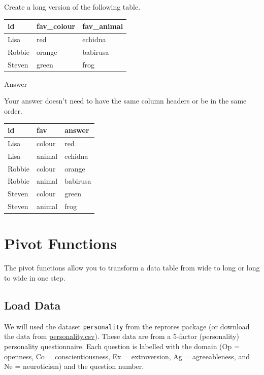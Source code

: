 \documentclass[
  oneside]{book}
\begin{document}
\begin{try}

Create a long version of the following table.

\begin{longtable}[]{@{}lll@{}}
\toprule
id & fav\_colour & fav\_animal \\
\midrule
\endhead
Lisa & red & echidna \\
Robbie & orange & babirusa \\
Steven & green & frog \\
\bottomrule
\end{longtable}

Answer

Your answer doesn't need to have the same column headers or be in the same order.

\begin{longtable}[]{@{}lll@{}}
\toprule
id & fav & answer \\
\midrule
\endhead
Lisa & colour & red \\
Lisa & animal & echidna \\
Robbie & colour & orange \\
Robbie & animal & babirusa \\
Steven & colour & green \\
Steven & animal & frog \\
\bottomrule
\end{longtable}

\end{try}

\hypertarget{pivot}{%
\section{Pivot Functions}\label{pivot}}

The pivot functions allow you to transform a data table from wide to long or long to wide in one step.

\hypertarget{load-data}{%
\subsection{Load Data}\label{load-data}}

We will used the dataset \texttt{personality} from the reprores package (or download the data from \href{./data/personality.csv}{personality.csv}). These data are from a 5-factor (personality) personality questionnaire. Each question is labelled with the domain (Op = openness, Co = conscientiousness, Ex = extroversion, Ag = agreeableness, and Ne = neuroticism) and the question number.
\end{document}
